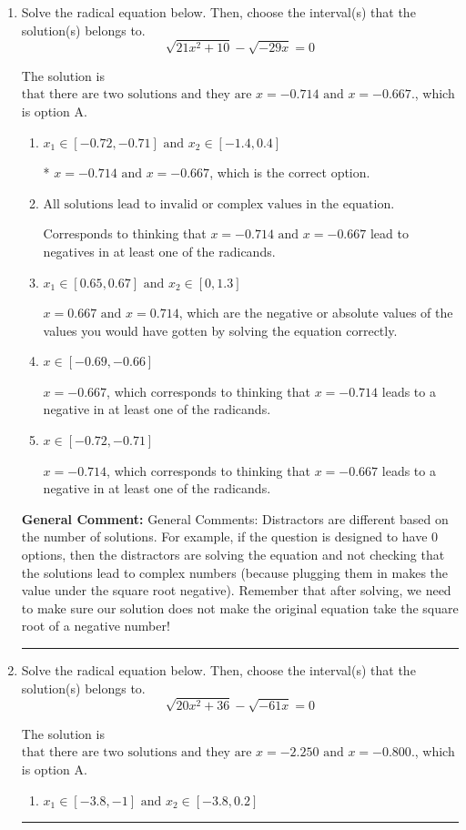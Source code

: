 \documentclass{extbook}[14pt]
\newcommand{\litem}[1]{\item #1

\rule{\textwidth}{0.4pt}}
\begin{document}
\begin{enumerate}\litem{
Solve the radical equation below. Then, choose the interval(s) that the solution(s) belongs to.
\[ \sqrt{21 x^2 + 10} - \sqrt{-29 x} = 0 \]

The solution is \( \text{that there are two solutions and they are } x = -0.714 \text{ and } x = -0.667. \), which is option A.\begin{enumerate}[label=\Alph*.]
\item \( x_1 \in [-0.72, -0.71] \text{ and } x_2 \in [-1.4,0.4] \)

* $x = -0.714 \text{ and } x = -0.667$, which is the correct option.
\item \( \text{All solutions lead to invalid or complex values in the equation.} \)

Corresponds to thinking that $x = -0.714 \text{ and } x = -0.667$ lead to negatives in at least one of the radicands.
\item \( x_1 \in [0.65, 0.67] \text{ and } x_2 \in [0,1.3] \)

$x = 0.667 \text{ and } x = 0.714$, which are the negative or absolute values of the values you would have gotten by solving the equation correctly.
\item \( x \in [-0.69,-0.66] \)

$x = -0.667$, which corresponds to thinking that $x = -0.714$ leads to a negative in at least one of the radicands.
\item \( x \in [-0.72,-0.71] \)

$x = -0.714$, which corresponds to thinking that $x = -0.667$ leads to a negative in at least one of the radicands.
\end{enumerate}

\textbf{General Comment:} General Comments: Distractors are different based on the number of solutions. For example, if the question is designed to have 0 options, then the distractors are solving the equation and not checking that the solutions lead to complex numbers (because plugging them in makes the value under the square root negative). Remember that after solving, we need to make sure our solution does not make the original equation take the square root of a negative number!
}
\litem{
Solve the radical equation below. Then, choose the interval(s) that the solution(s) belongs to.
\[ \sqrt{20 x^2 + 36} - \sqrt{-61 x} = 0 \]

The solution is \( \text{that there are two solutions and they are } x = -2.250 \text{ and } x = -0.800. \), which is option A.\begin{enumerate}[label=\Alph*.]
\item \( x_1 \in [-3.8, -1] \text{ and } x_2 \in [-3.8,0.2] \)


\end{enumerate}}
\end{enumerate}
\end{document}
